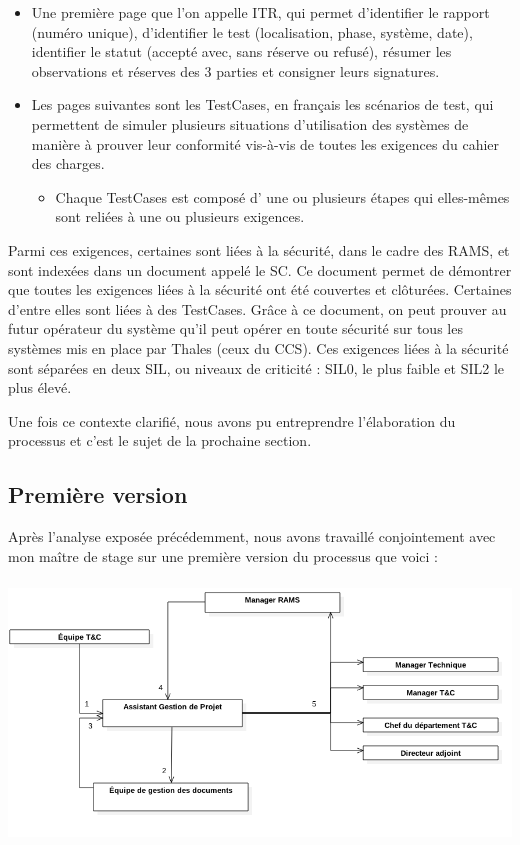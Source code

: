 \begin{itemize}
\item Une première page que l'on appelle ITR, qui permet d'identifier le rapport (numéro unique), d'identifier le test (localisation, phase, système, date), identifier le statut (accepté avec, sans réserve ou refusé), résumer les observations et réserves des 3 parties et consigner leurs signatures.
\item Les pages suivantes sont les \gls{TestCases}, en français les scénarios de test, qui permettent de simuler plusieurs situations d'utilisation des systèmes de manière à prouver leur conformité vis-à-vis de toutes les exigences du cahier des charges.
\begin{itemize}
\item Chaque \gls{TestCases} est composé d’ une ou plusieurs étapes qui elles-mêmes sont reliées à une ou plusieurs exigences.
\end{itemize}
\end{itemize}

Parmi ces exigences, certaines sont liées à la sécurité, dans le cadre des \gls{RAMS}, et sont indexées dans un document appelé le \gls{SC}. Ce document permet de démontrer que toutes les exigences liées à la sécurité ont été couvertes et clôturées. Certaines d'entre elles sont liées à des \gls{TestCases}. Grâce à ce document, on peut prouver au futur opérateur du système qu'il peut opérer en toute sécurité sur tous les systèmes mis en place par Thales (ceux du \gls{CCS}).
Ces exigences liées à la sécurité sont séparées en deux \gls{SIL}, ou niveaux de criticité : SIL0, le plus faible et SIL2 le plus élevé.

Une fois ce contexte clarifié, nous avons pu entreprendre l'élaboration du processus et c'est le sujet de la prochaine section.

\subsection{Première version}

Après l'analyse exposée précédemment, nous avons travaillé conjointement avec mon maître de stage sur une première version du processus que voici :

\begin{center}
\includegraphics[height=7cm]{ressources/images/figures/Workflow1.png}
\end{center}


